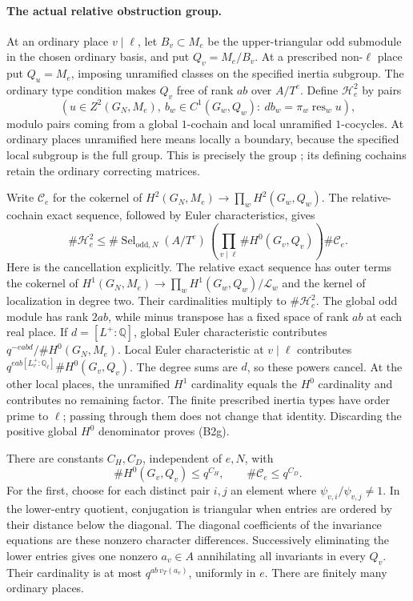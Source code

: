 \paragraph{The actual relative obstruction group.}
At an ordinary place \(v\mid\ell\), let \(B_v\subset M_e\) be
the upper-triangular odd submodule in the chosen ordinary basis,
and put \(Q_v=M_e/B_v\).
At a prescribed non-\(\ell\) place put \(Q_u=M_e\), imposing
unramified classes on the specified inertia subgroup.
The ordinary type condition makes \(Q_v\) free of rank \(ab\)
over \(A/T^e\).
Define \(\mathcal H^2_e\) by pairs
\[
 \left(u\in Z^2(G_N,M_e),\
       b_w\in C^1(G_w,Q_w):\
       db_w=\pi_w\operatorname{res}_w u\right),
\]
modulo pairs coming from a global \(1\)-cochain and local
unramified \(1\)-cocycles.
At ordinary places unramified here means locally a boundary,
because the specified local subgroup is the full group.
This is precisely the group
\srcid{Dat.H2LocalConditions}; its defining cochains retain the
ordinary correcting matrices.

Write \(\mathcal C_e\) for the cokernel of
\(H^2(G_N,M_e)\to\prod_wH^2(G_w,Q_w)\).
The relative-cochain exact sequence, followed by Euler
characteristics, gives
\[
 \#\mathcal H^2_e
 \leq
 \#\operatorname{Sel}_{\mathrm{odd},N}(A/T^e)\,
 \left(\prod_{v\mid\ell}\#H^0(G_v,Q_v)\right)\#\mathcal C_e.
 \tag{B2g}
\]
Here is the cancellation explicitly.
The relative exact sequence has outer terms the cokernel of
\(H^1(G_N,M_e)\to\prod_wH^1(G_w,Q_w)/\mathcal L_w\)
and the kernel of localization in degree two.
Their cardinalities multiply to \(\#\mathcal H^2_e\).
The global odd module has rank \(2ab\), while minus transpose
has a fixed space of rank \(ab\) at each real place.
If \(d=[L^+:\mathbb Q]\), global Euler characteristic contributes
\(q^{-eabd}/\#H^0(G_N,M_e)\).
Local Euler characteristic at \(v\mid\ell\) contributes
\(q^{eab[L^+_v:\mathbb Q_\ell]}\#H^0(G_v,Q_v)\).
The degree sums are \(d\), so these powers cancel.
At the other local places, the unramified \(H^1\) cardinality
equals the \(H^0\) cardinality and contributes no remaining factor.
The finite prescribed inertia types have order prime to \(\ell\);
passing through them does not change that identity.
Discarding the positive global \(H^0\) denominator proves (B2g).

There are constants \(C_H,C_D\), independent of \(e,N\), with
\[
 \#H^0(G_v,Q_v)\leq q^{C_H},\qquad
 \#\mathcal C_e\leq q^{C_D}.
 \tag{B2h}
\]
For the first, choose for each distinct pair \(i,j\) an element
where \(\psi_{v,i}/\psi_{v,j}\ne1\).
In the lower-entry quotient, conjugation is triangular when entries
are ordered by their distance below the diagonal.
The diagonal coefficients of the invariance equations are these
nonzero character differences.
Successively eliminating the lower entries gives one nonzero
\(a_v\in A\) annihilating all invariants in every \(Q_v\).
Their cardinality is at most
\(q^{ab\,v_T(a_v)}\), uniformly in \(e\).
There are finitely many ordinary places.

